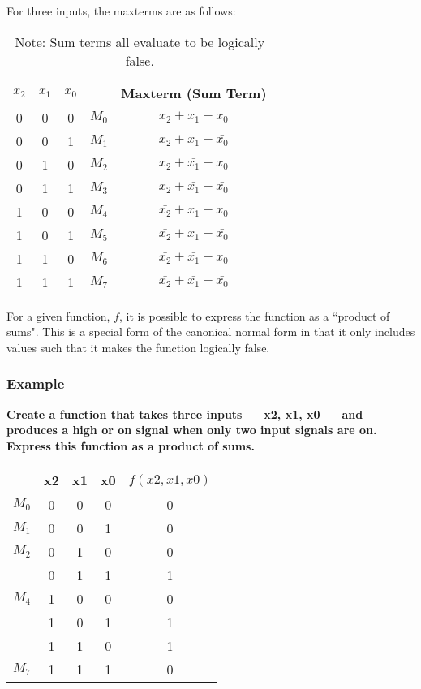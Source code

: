 \documentclass[11pt]{article}
\begin{document}
\noindent For three inputs, the maxterms are as follows:

\begin{table}[H]
	\centering
	\begin{tabular}{c c c | c | c}
		\( x_2 \)	&	\( x_1 \)	&	\( x_0 \)	&	&	Maxterm (Sum Term)\\
		\hline
		0			&	0			&	0		&	\( M_0 \)	&	\( x_2 + x_1 + x_0 \) \\	
		0			&	0			&	1		&	\( M_1 \)	&	\( x_2 + x_1 + \bar{x_0} \) \\
		0			&	1			&	0		&	\( M_2 \)	&	\( x_2 + \bar{x_1} + x_0 \) \\
		0			&	1			&	1		&	\( M_3 \)	&	\( x_2 + \bar{x_1} + \bar{x_0} \) \\
		1			&	0			&	0		&	\( M_4 \)	&	\( \bar{x_2} + x_1 + x_0 \) \\
		1			&	0			&	1		&	\( M_5 \)	&	\( \bar{x_2} + x_1 + \bar{x_0} \) \\
		1			&	1			&	0		&	\( M_6 \)	&	\( \bar{x_2} + \bar{x_1} + x_0 \) \\
		1			&	1			&	1		&	\( M_7 \)	&	\( \bar{x_2} + \bar{x_1} + \bar{x_0} \) \\
	\end{tabular}
	\caption*{Note: Sum terms all evaluate to be logically false.}
\end{table}

\noindent For a given function, \( f \), it is possible to express the function as a ``product of sums". This is a special form of the canonical normal form in that it only includes values such that it makes the function logically false.

\subsubsection{Example}

\textbf{Create a function that takes three inputs --- x2, x1, x0 --- and produces a high or on signal when only two input signals are on. Express this function as a product of sums.}

\begin{table}[H]
	\centering
	\begin{tabular}{c c c c | c}
		&	x2	&	x1	&	x0	&	\( f(x2,x1,x0) \)\\
		\hline
		\( M_0 \)	&	0	&	0	&	0	&	0\\
		\( M_1 \)	&	0	&	0	&	1	&	0\\
		\( M_2 \)	&	0	&	1	&	0	&	0\\
					&	0	&	1	&	1	&	1\\
		\( M_4 \)	&	1	&	0	&	0	&	0\\
					&	1	&	0	&	1	&	1\\
					&	1	&	1	&	0	&	1\\
		\( M_7 \)	&	1	&	1	&	1	&	0
	\end{tabular}
\end{table}
\end{document}
